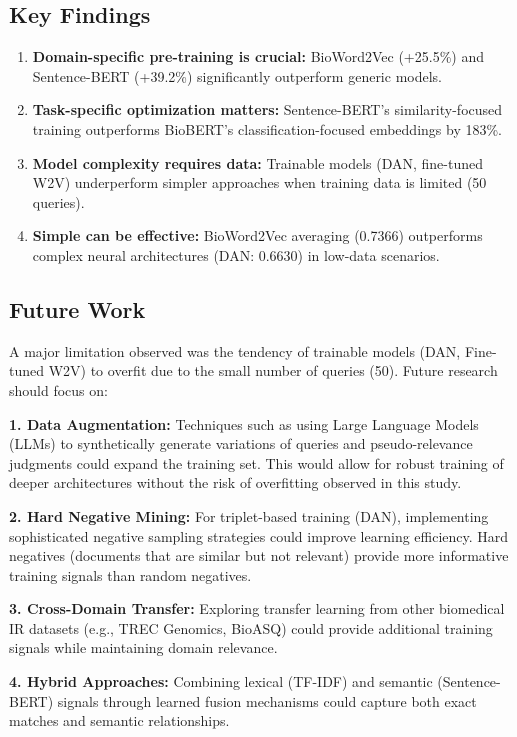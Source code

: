 \documentclass[sigconf,nonacm]{acmart}
\begin{document}
\subsection{Key Findings}
\begin{enumerate}
    \item \textbf{Domain-specific pre-training is crucial:} BioWord2Vec (+25.5\%) and Sentence-BERT (+39.2\%) significantly outperform generic models.
    \item \textbf{Task-specific optimization matters:} Sentence-BERT's similarity-focused training outperforms BioBERT's classification-focused embeddings by 183\%.
    \item \textbf{Model complexity requires data:} Trainable models (DAN, fine-tuned W2V) underperform simpler approaches when training data is limited (50 queries).
    \item \textbf{Simple can be effective:} BioWord2Vec averaging (0.7366) outperforms complex neural architectures (DAN: 0.6630) in low-data scenarios.
\end{enumerate}

\subsection{Future Work}
A major limitation observed was the tendency of trainable models (DAN, Fine-tuned W2V) to overfit due to the small number of queries (50). Future research should focus on:

\textbf{1. Data Augmentation:} Techniques such as using Large Language Models (LLMs) to synthetically generate variations of queries and pseudo-relevance judgments could expand the training set. This would allow for robust training of deeper architectures without the risk of overfitting observed in this study.

\textbf{2. Hard Negative Mining:} For triplet-based training (DAN), implementing sophisticated negative sampling strategies could improve learning efficiency. Hard negatives (documents that are similar but not relevant) provide more informative training signals than random negatives.

\textbf{3. Cross-Domain Transfer:} Exploring transfer learning from other biomedical IR datasets (e.g., TREC Genomics, BioASQ) could provide additional training signals while maintaining domain relevance.

\textbf{4. Hybrid Approaches:} Combining lexical (TF-IDF) and semantic (Sentence-BERT) signals through learned fusion mechanisms could capture both exact matches and semantic relationships.
\end{document}
